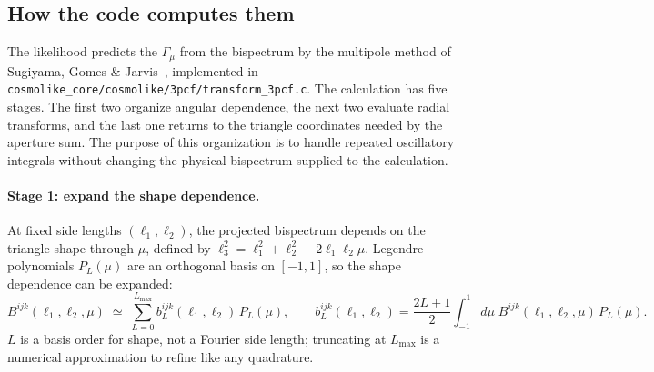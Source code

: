 \documentclass[11pt]{article}
\newcommand{\us}{\_\allowbreak}
\numberwithin{equation}{section}
\begin{document}
\subsection{How the code computes them}
\label{sec:multipole}

The likelihood predicts the $\Gamma_\mu$ from the bispectrum by the
multipole method of Sugiyama, Gomes \& Jarvis~\cite{fastnc},
implemented in
\texttt{cosmolike\us core/cosmolike/3pcf/transform\us 3pcf.c}.  The calculation has five stages. The first two organize angular
dependence, the next two evaluate radial transforms, and the last one
returns to the triangle coordinates needed by the aperture sum. The
purpose of this organization is to handle repeated oscillatory integrals
without changing the physical bispectrum supplied to the calculation.

\paragraph{Stage 1: expand the shape dependence.}
At fixed side lengths $(\ell_1, \ell_2)$, the projected bispectrum
depends on the triangle shape through
$\mu$, defined by $\ell_3^2 = \ell_1^2 + \ell_2^2 -
2\ell_1\ell_2\mu$.  Legendre polynomials $P_L(\mu)$ are an
orthogonal basis on $[-1, 1]$, so the shape dependence can be
expanded:
\begin{equation}
  B^{ijk}(\ell_1,\ell_2,\mu)
  \;\simeq\; \sum_{L=0}^{L_{\max}}
  b_L^{ijk}(\ell_1,\ell_2)\, P_L(\mu),
  \qquad
  b_L^{ijk}(\ell_1,\ell_2)
  = \frac{2L+1}{2}\int_{-1}^{1} d\mu\;
  B^{ijk}(\ell_1,\ell_2,\mu)\, P_L(\mu) .
  \label{eq:legendre}
\end{equation}
$L$ is a basis order for shape, not a Fourier side length;
truncating at $L_{\max}$ is a numerical approximation to refine like
any quadrature.
\end{document}
